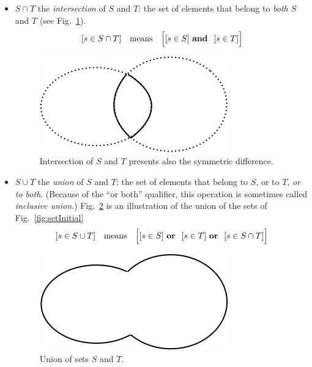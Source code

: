 \begin{itemize}
\item
$S \cap T$ the {\it
  intersection}
of $S$ and $T$: the set of elements that belong to {\em both} $S$ and
$T$ (see Fig.~\ref{fig:setIntersection}).
\[ [s \in S \cap T] \ \ \mbox{ means } \ \ 
\Big[ [s \in S] \ \mbox{\bf and } \ [s \in T] \Big]
\]
\begin{figure}[htb]
\begin{center}
        \includegraphics[scale=0.4]{FiguresMaths/setIntersection}
        \caption{Intersection of $S$ and $T$ {\Denis presents also the symmetric difference}.}
        \label{fig:setIntersection}
\end{center}
\end{figure}
\item
$S \cup T$ the {\it
  union}
of $S$ and $T$: the set of elements that belong to $S$, or to $T$, {\em
  or to both}.  (Because of the ``or both'' qualifier, this operation
is sometimes called {\em inclusive
  union}.)
  Fig.~\ref{fig:setUnion} is an illustration of the union of the sets of Fig.~\ref{fig:setInitial}
\[ [s \in S \cup T] \ \ \mbox{ means } \ \
\Big[ [s \in S] \ \mbox{\bf or } \ [s \in T]  \ \mbox{\bf or } \ [s
    \in S \cap T] \Big]
\]
\begin{figure}[htb]
\begin{center}
        \includegraphics[scale=0.4]{FiguresMaths/setUnion}
        \caption{Union of sets $S$ and $T$.}
        \label{fig:setUnion}
\end{center}

\end{figure}
\end{itemize}
